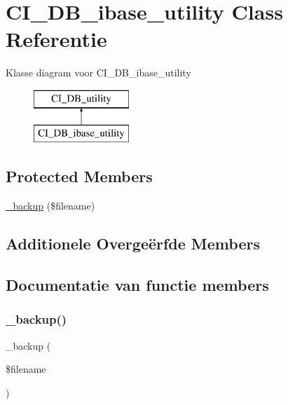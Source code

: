 \hypertarget{class_c_i___d_b__ibase__utility}{}\section{C\+I\+\_\+\+D\+B\+\_\+ibase\+\_\+utility Class Referentie}
\label{class_c_i___d_b__ibase__utility}
Klasse diagram voor C\+I\+\_\+\+D\+B\+\_\+ibase\+\_\+utility\begin{figure}[H]
\begin{center}
\leavevmode
\includegraphics[height=2.000000cm]{class_c_i___d_b__ibase__utility}
\end{center}
\end{figure}
\subsection*{Protected Members}
\begin{DoxyCompactItemize}
\item 
\mbox{\hyperlink{class_c_i___d_b__ibase__utility_a25acdcc54da34a10f507e2abd93feca1}{\+\_\+backup}} (\$filename)
\end{DoxyCompactItemize}
\subsection*{Additionele Overge\"{e}rfde Members}


\subsection{Documentatie van functie members}
\mbox{\label{class_c_i___d_b__ibase__utility_a25acdcc54da34a10f507e2abd93feca1}} 
\subsubsection{\texorpdfstring{\_backup()}{\_backup()}}
{\footnotesize\ttfamily \+\_\+backup (\begin{DoxyParamCaption}\item[{}]{\$filename }\end{DoxyParamCaption})\hspace{0.3cm}{\ttfamily [protected]}}


